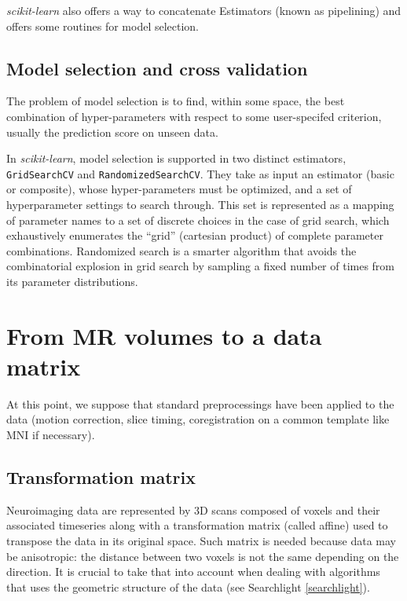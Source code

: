 \documentclass{frontiersSCNS} %
\newcommand{\fabian}[1]{\todo[inline, color=blue!40]{#1}}
\begin{document}
{\em scikit-learn} also offers a way to concatenate Estimators (known as
pipelining) and offers some routines for model selection.

\subsection{Model selection and cross validation}

The problem of model selection is to find, within some space, the best
combination of hyper-parameters with respect to some user-specifed criterion,
usually the prediction score on unseen data.

In {\em scikit-learn}, model selection is supported in two distinct
estimators, \texttt{GridSearchCV} and \texttt{RandomizedSearchCV}.  They take
as input an estimator (basic or composite), whose hyper-parameters must be
optimized, and a set of hyperparameter settings to search through. This set is
represented as a mapping of parameter names to a set of discrete choices in
the case of grid search, which exhaustively enumerates the ``grid'' (cartesian
product) of complete parameter combinations. Randomized search is a smarter
algorithm that avoids the combinatorial explosion in grid search by sampling a
fixed number of times from its parameter distributions.

\fabian{should we put an example here ?}

\section{From MR volumes to a data matrix}

At this point, we suppose that standard preprocessings have been applied to the
data (motion correction, slice timing, coregistration on a common template like
MNI if necessary).

\subsection{Transformation matrix}

Neuroimaging data are represented by 3D scans composed of voxels and their
associated timeseries along with a transformation matrix (called affine)
used to transpose the data in its original space.
Such matrix is needed because data may be anisotropic: the distance between
two voxels is not the same depending on the direction.
It is crucial to take that into account when dealing with
algorithms that uses the geometric structure of the data (see Searchlight
\ref{searchlight}).
\end{document}
